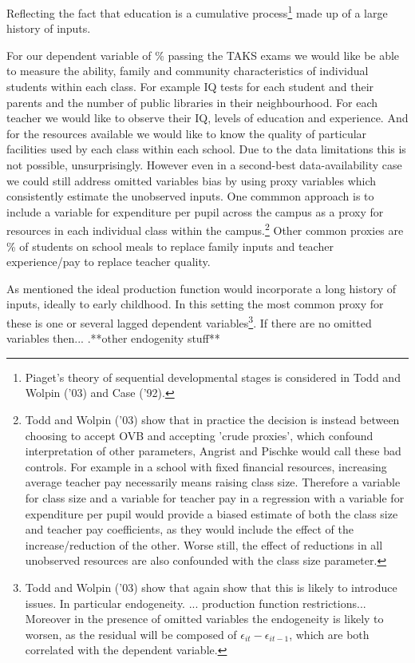 \documentclass[11pt]{article}
\begin{document}
Reflecting the fact that education is a cumulative process\footnote{Piaget’s theory of sequential developmental stages is considered in Todd and Wolpin ('03) and Case ('92).} made up of a large history of inputs. 

For our dependent variable of \% passing the TAKS exams we would like be able to measure the ability, family and community characteristics of individual students within each class. For example IQ tests for each student and their parents and the number of public libraries in their neighbourhood. For each teacher we would like to observe their IQ, levels of education and experience. And for the resources available we would like to know the quality of particular facilities used by each class within each school. Due to the data limitations this is not possible, unsurprisingly. However even in a second-best data-availability case we could still address omitted variables bias by using proxy variables which consistently estimate the unobserved inputs. One commmon approach is to include a variable for expenditure per pupil across the campus as a proxy for resources in each individual class within the campus.\footnote{Todd and Wolpin ('03) show that in practice the decision is instead between choosing to accept OVB and accepting 'crude proxies', which confound interpretation of other parameters, Angrist and Pischke would call these bad controls. For example in a school with fixed financial resources, increasing average teacher pay necessarily means raising class size. Therefore a variable for class size and a variable for teacher pay in a regression with a variable for expenditure per pupil would provide a biased estimate of both the class size and teacher pay coefficients, as they would include the effect of the increase/reduction of the other. Worse still, the effect of reductions in all unobserved resources are also confounded with the class size parameter.} Other common proxies are \% of students on school meals to replace family inputs and teacher experience/pay to replace teacher quality.  

As mentioned the ideal production function would incorporate a long history of inputs, ideally to early childhood. In this setting the most common proxy for these is one or several lagged dependent variables\footnote{Todd and Wolpin ('03) show that again show that this is likely to introduce issues. In particular endogeneity. ... production function restrictions... Moreover in the presence of omitted variables the endogeneity is likely to worsen, as the residual will be composed of $\epsilon_{it}-\epsilon_{it-1}$, which are both correlated with the dependent variable.}. If there are no omitted variables then...  .**other endogenity stuff** 
\end{document}
